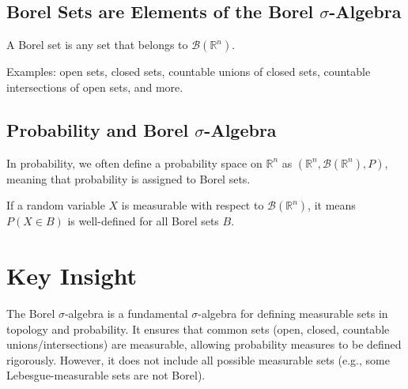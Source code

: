 \documentclass{article}
\begin{document}
\subsection*{Borel Sets are Elements of the Borel \(\sigma\)-Algebra}
A Borel set is any set that belongs to \(\mathcal{B}(\mathbb{R}^n)\). 

Examples: open sets, closed sets, countable unions of closed sets, countable intersections of open sets, and more.

\subsection*{Probability and Borel \(\sigma\)-Algebra}
In probability, we often define a probability space on \(\mathbb{R}^n\) as \(
(\mathbb{R}^n, \mathcal{B}(\mathbb{R}^n), P)
\), meaning that probability is assigned to Borel sets.

If a random variable \(X\) is measurable with respect to \(\mathcal{B}(\mathbb{R}^n)\), it means \( P(X \in B) \) is well-defined for all Borel sets \(B\).

\section*{Key Insight}
The Borel \(\sigma\)-algebra is a fundamental \(\sigma\)-algebra for defining measurable sets in topology and probability. It ensures that common sets (open, closed, countable unions/intersections) are measurable, allowing probability measures to be defined rigorously. However, it does not include all possible measurable sets (e.g., some Lebesgue-measurable sets are not Borel).
\end{document}

